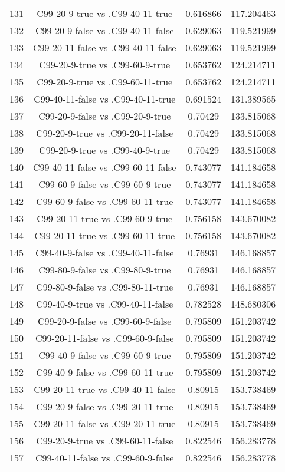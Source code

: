 \documentclass[a4paper,10pt]{article}
\begin{document}
\begin{landscape}
\begin{table}[!htp]
\begin{tabular}{cccc}
131&C99-20-9-true vs .C99-40-11-true&0.616866&117.204463\\
132&C99-20-9-false vs .C99-40-11-false&0.629063&119.521999\\
133&C99-20-11-false vs .C99-40-11-false&0.629063&119.521999\\
134&C99-20-9-true vs .C99-60-9-true&0.653762&124.214711\\
135&C99-20-9-true vs .C99-60-11-true&0.653762&124.214711\\
136&C99-40-11-false vs .C99-40-11-true&0.691524&131.389565\\
137&C99-20-9-false vs .C99-20-9-true&0.70429&133.815068\\
138&C99-20-9-true vs .C99-20-11-false&0.70429&133.815068\\
139&C99-20-9-true vs .C99-40-9-true&0.70429&133.815068\\
140&C99-40-11-false vs .C99-60-11-false&0.743077&141.184658\\
141&C99-60-9-false vs .C99-60-9-true&0.743077&141.184658\\
142&C99-60-9-false vs .C99-60-11-true&0.743077&141.184658\\
143&C99-20-11-true vs .C99-60-9-true&0.756158&143.670082\\
144&C99-20-11-true vs .C99-60-11-true&0.756158&143.670082\\
145&C99-40-9-false vs .C99-40-11-false&0.76931&146.168857\\
146&C99-80-9-false vs .C99-80-9-true&0.76931&146.168857\\
147&C99-80-9-false vs .C99-80-11-true&0.76931&146.168857\\
148&C99-40-9-true vs .C99-40-11-false&0.782528&148.680306\\
149&C99-20-9-false vs .C99-60-9-false&0.795809&151.203742\\
150&C99-20-11-false vs .C99-60-9-false&0.795809&151.203742\\
151&C99-40-9-false vs .C99-60-9-true&0.795809&151.203742\\
152&C99-40-9-false vs .C99-60-11-true&0.795809&151.203742\\
153&C99-20-11-true vs .C99-40-11-false&0.80915&153.738469\\
154&C99-20-9-false vs .C99-20-11-true&0.80915&153.738469\\
155&C99-20-11-false vs .C99-20-11-true&0.80915&153.738469\\
156&C99-20-9-true vs .C99-60-11-false&0.822546&156.283778\\
157&C99-40-11-false vs .C99-60-9-false&0.822546&156.283778\\

\end{tabular}
\end{table}
\end{landscape}
\end{document}
